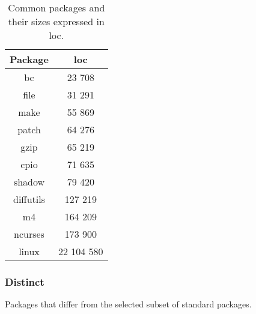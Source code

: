\begin{table}[!h]
    \centering
    \begin{tabular}{|c||c|}
        \hline
        Package & \gls{loc} \\
        \hline
        \hline
        bc \cite{bc} & 23 708 \\
        \hline        
        file\cite{file} & 31 291 \\
        \hline
        make \cite{make} & 55 869 \\
        \hline
        patch \cite{patch} & 64 276 \\
        \hline
        gzip\cite{gzip} & 65 219 \\
        \hline
        cpio \cite{cpio} & 71 635 \\
        \hline
        shadow\cite{shadow} & 79 420 \\
        \hline
        diffutils \cite{diffutils} & 127 219 \\
        \hline
        m4 \cite{m4} & 164 209 \\
        \hline
        ncurses \cite{ncurses} & 173 900 \\
        \hline
        linux \cite{linux} & 22 104 580 \\
        \hline
    \end{tabular}
    \caption{Common packages and their sizes expressed in \gls{loc}.}
\end{table}

\newpage

\subsubsection{Distinct}

Packages that differ from the selected subset of standard packages.

